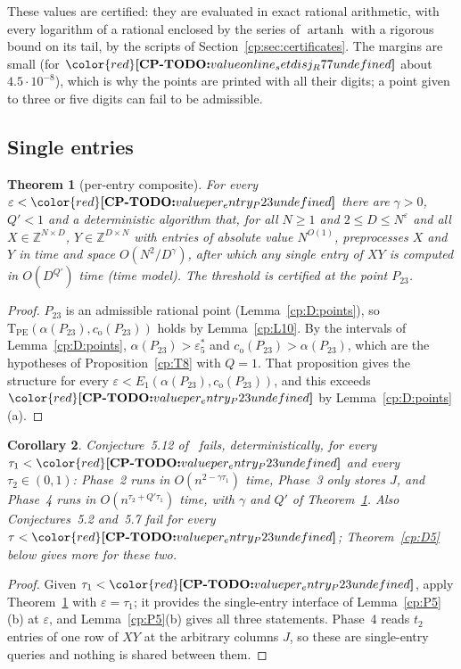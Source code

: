 \documentclass[11pt]{article}
\makeatletter
\newtheorem{theorem}{Theorem}[section]
\newtheorem{corollary}[theorem]{Corollary}
\theoremstyle{definition}
\theoremstyle{remark}
\DeclareRobustCommand{\CPTODO}[1]{{\color{red}\textbf{[CP-TODO:} #1\textbf{]}}}
\providecommand{\eps}{\varepsilon}
\providecommand{\Z}{\mathbb{Z}}
\newcommand{\es}{\varepsilon^*_5}             %
\newcommand{\co}{c_{\mathrm o}}               %
\newcommand{\TPE}{\mathrm{T}_{\mathrm{PE}}}   %
\newcommand{\Ptt}{P_{23}}                     %
\newcommand{\cpv}[1]{\ifcsname cpv@#1\endcsname\csname cpv@#1\endcsname\else\CPTODO{value #1 undefined}\fi}
\makeatother
\begin{document}
These values are certified: they are evaluated in exact rational arithmetic, with every logarithm of a rational enclosed by the series of $\operatorname{artanh}$ with a rigorous bound on its tail, by the scripts of Section~\ref{cp:sec:certificates}. The margins are small (for $\cpv{online_setdisj_R77}$ about $4.5\cdot10^{-8}$), which is why the points are printed with all their digits; a point given to three or five digits can fail to be admissible.

\subsection{Single entries}\label{cp:sec:D:entries}

\begin{theorem}[per-entry composite]\label{cp:D1}
For every $\eps<\cpv{per_entry_P23}$ there are $\gamma>0$, $Q'<1$ and a deterministic algorithm that, for all $N\ge1$ and $2\le D\le N^\eps$ and all $X\in\Z^{N\times D}$, $Y\in\Z^{D\times N}$ with entries of absolute value $N^{O(1)}$, preprocesses $X$ and $Y$ in time and space $O(N^2/D^\gamma)$, after which any single entry of $XY$ is computed in $O(D^{Q'})$ time (time model). The threshold is certified at the point $\Ptt$.
\end{theorem}

\begin{proof}
$\Ptt$ is an admissible rational point (Lemma~\ref{cp:D:points}), so $\TPE(\alpha(\Ptt),\co(\Ptt))$ holds by Lemma~\ref{cp:L10}. By the intervals of Lemma~\ref{cp:D:points}, $\alpha(\Ptt)>\es$ and $\co(\Ptt)>\alpha(\Ptt)$, which are the hypotheses of Proposition~\ref{cp:T8} with $Q=1$. That proposition gives the structure for every $\eps<E_1(\alpha(\Ptt),\co(\Ptt))$, and this exceeds $\cpv{per_entry_P23}$ by Lemma~\ref{cp:D:points}(a).
\end{proof}

\begin{corollary}\label{cp:D2}
Conjecture~5.12 of~\cite{BNS19} fails, deterministically, for every $\tau_1<\cpv{per_entry_P23}$ and every $\tau_2\in(0,1)$: Phase~2 runs in $O(n^{2-\gamma\tau_1})$ time, Phase~3 only stores $J$, and Phase~4 runs in $O(n^{\tau_2+Q'\tau_1})$ time, with $\gamma$ and $Q'$ of Theorem~\ref{cp:D1}. Also Conjectures~5.2 and~5.7 fail for every $\tau<\cpv{per_entry_P23}$; Theorem~\ref{cp:D5} below gives more for these two.
\end{corollary}

\begin{proof}
Given $\tau_1<\cpv{per_entry_P23}$, apply Theorem~\ref{cp:D1} with $\eps=\tau_1$; it provides the single-entry interface of Lemma~\ref{cp:P5}(b) at $\eps$, and Lemma~\ref{cp:P5}(b) gives all three statements. Phase~4 reads $t_2$ entries of one row of $XY$ at the arbitrary columns $J$, so these are single-entry queries and nothing is shared between them.
\end{proof}
\end{document}
